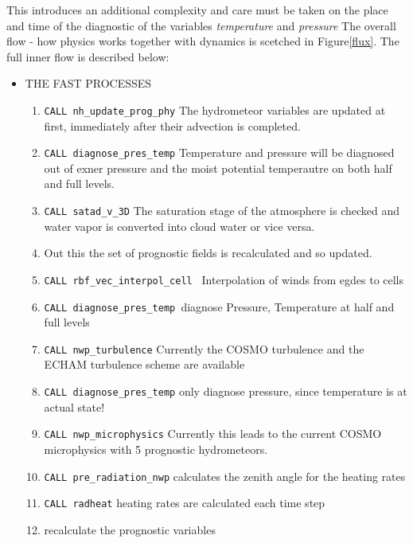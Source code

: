 This introduces an additional complexity and care must be taken on the place and time of the diagnostic of the variables \emph{temperature} and \emph{pressure}
The overall flow - how physics works together with dynamics is scetched in Figure{\ref{flux}}. The full inner flow is described below:

\begin{itemize}

\item THE FAST PROCESSES
\begin{enumerate}

\item \texttt{CALL nh\_update\_prog\_phy} The hydrometeor variables are updated at first, immediately after their advection is completed.
\item \texttt{CALL diagnose\_pres\_temp} Temperature and pressure will be diagnosed  out of exner pressure and the moist potential temperautre on both half and full levels.

\item \texttt{CALL satad\_v\_3D} The saturation stage of the atmosphere is checked and water vapor is converted into cloud water or vice versa.

\item Out this the set of prognostic fields is recalculated and so updated.

\item \texttt{CALL rbf\_vec\_interpol\_cell } Interpolation of winds from egdes to cells

\item \texttt{CALL diagnose\_pres\_temp }diagnose Pressure, Temperature at half and full levels

\item  \texttt{CALL nwp\_turbulence} Currently the COSMO turbulence and the ECHAM turbulence scheme are available
\item \texttt{CALL diagnose\_pres\_temp} only diagnose pressure, since temperature is at actual state!
\item  \texttt{CALL nwp\_microphysics} Currently this leads to the current COSMO microphysics with 5 prognostic hydrometeors.

\item \texttt{CALL pre\_radiation\_nwp} calculates the zenith angle for the heating rates
\item \texttt{CALL radheat} heating rates are calculated each time step
\item recalculate the prognostic variables


\end{enumerate}
\end{itemize}
